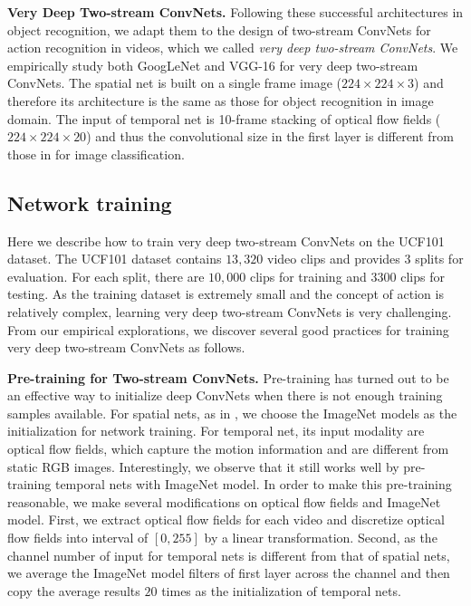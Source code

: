 \documentclass[10pt,twocolumn,letterpaper]{article}
\begin{document}
\textbf{Very Deep Two-stream ConvNets.} Following these successful architectures in object recognition, we adapt them to the design of two-stream ConvNets for action recognition in videos, which we called \emph{very deep two-stream ConvNets}. We empirically study both GoogLeNet and VGG-16 for very deep two-stream ConvNets. The spatial net is built on a single frame image ($224 \times 224 \times 3$) and therefore its architecture is the same as those for object recognition in image domain. The input of temporal net is 10-frame stacking of optical flow fields ($224 \times 224 \times 20$) and thus the convolutional size in the first layer is different from those in for image classification.

\subsection{Network training}
Here we describe how to train very deep two-stream ConvNets on the UCF101 dataset. The UCF101 dataset contains $13,320$ video clips and provides 3 splits for evaluation. For each split, there are $10,000$ clips for training and $3300$ clips for testing. As the training dataset is extremely small and the concept of action is relatively complex, learning very deep two-stream ConvNets is very challenging. From our empirical explorations, we discover several good practices for training very deep two-stream ConvNets as follows.

\textbf{Pre-training for Two-stream ConvNets.} Pre-training has turned out to be an effective way to initialize deep ConvNets when there is not enough training samples available. For spatial nets, as in \cite{SimonyanZ14}, we choose the ImageNet models as the initialization for network training. For temporal net, its input modality are optical flow fields, which capture the motion information and are different from static RGB images. Interestingly, we observe that it still works well by pre-training temporal nets with ImageNet model. In order to make this pre-training reasonable, we make several modifications on optical flow fields and ImageNet model. First, we extract optical flow fields for each video and discretize optical flow fields into interval of $[0,255]$ by a linear transformation. Second, as the channel number of input for temporal nets is different from that of spatial nets, we average the ImageNet model filters of first layer across the channel and then copy the average results $20$ times as the initialization of temporal nets.
\end{document}
